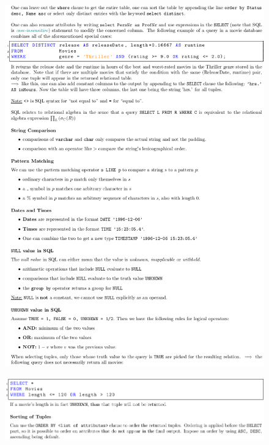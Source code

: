 \documentclass[11pt,oneside,a4paper]{article}
\begin{document}
\newpage
\vspace{-\topsep}
\begin{figure}[t!]
	\centering
	\includegraphics[width=1\linewidth]{figures/sql_4}
	\label{fig:sql4}
\end{figure}
\vspace{-\topsep}

\newpage

\vspace{-\topsep}
\begin{figure}[t!]
	\centering
	\includegraphics[width=0.95\linewidth]{figures/sql_5}
	\label{fig:sql5}
\end{figure}
\vspace{-\topsep}
\end{document}

